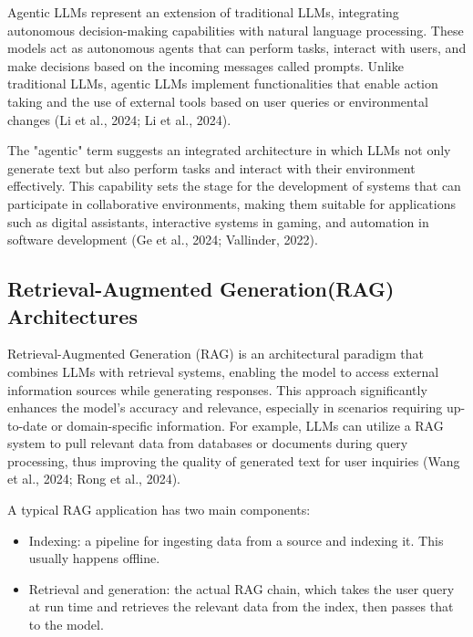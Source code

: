 Agentic LLMs represent an extension of traditional LLMs, integrating autonomous decision-making capabilities with natural language processing. These models act as autonomous agents that can perform tasks, interact with users, and make decisions based on the incoming messages called prompts. Unlike traditional LLMs, agentic LLMs implement functionalities that enable action taking and the use of external tools based on user queries or environmental changes (Li et al., 2024; Li et al., 2024).

The "agentic" term suggests an integrated architecture in which LLMs not only generate text but also perform tasks and interact with their environment effectively. This capability sets the stage for the development of systems that can participate in collaborative environments, making them suitable for applications such as digital assistants, interactive systems in gaming, and automation in software development (Ge et al., 2024; Vallinder, 2022).


\subsection{Retrieval-Augmented Generation(RAG) Architectures}
\label{subsec:background:second_section:third_subsection}

Retrieval-Augmented Generation (RAG) is an architectural paradigm that combines LLMs with retrieval systems, enabling the model to access external information sources while generating responses. This approach significantly enhances the model's accuracy and relevance, especially in scenarios requiring up-to-date or domain-specific information. For example, LLMs can utilize a RAG system to pull relevant data from databases or documents during query processing, thus improving the quality of generated text for user inquiries (Wang et al., 2024; Rong et al., 2024).

A typical RAG application has two main components:

\begin{itemize}
    \item Indexing: a pipeline for ingesting data from a source and indexing it. This usually happens offline.
    \item Retrieval and generation: the actual RAG chain, which takes the user query at run time and retrieves the relevant data from the index, then passes that to the model.
\end{itemize}

